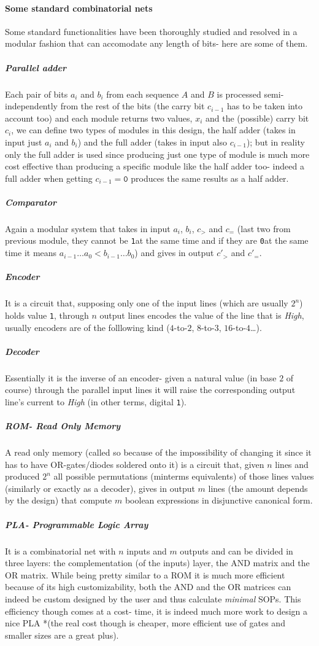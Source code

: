 \documentclass{scrartcl}
\newcommand{\zero}{\texttt{0}}
\newcommand{\one}{\texttt{1}}
\begin{document}
    \paragraph{Some standard combinatorial nets} Some standard functionalities have been thoroughly studied and resolved in a modular fashion that can accomodate any length of bits- here are some of them.
    \subparagraph{Parallel adder} Each pair of bits $a_i$ and $b_i$ from each sequence $A$ and $B$ is processed semi-independently from the rest of the bits (the carry bit $c_{i-1}$ has to be taken into account too) and each module returns two values, $x_i$ and the (possible) carry bit $c_i$, we can define two types of modules in this design, the half adder (takes in input just $a_i$ and $b_i$) and the full adder (takes in input also $c_{i-1}$); but in reality only the full adder is used since producing just one type of module is much more cost effective than producing a specific module like the half adder too- indeed a full adder when getting $c_{i-1}=\zero$ produces the same results as a half adder.
    \subparagraph{Comparator} Again a modular system that takes in input $a_i$, $b_i$, $c_{>}$ and $c_{=}$ (last two from previous module, they cannot be \one at the same time and if they are \zero at the same time it means $a_{i-1}\dots a_0 < b_{i-1}\dots b_0$) and gives in output $c'_{>}$ and $c'_{=}$.
    \subparagraph{Encoder} It is a circuit that, supposing only one of the input lines (which are usually $2^n$) holds value \one, through $n$ output lines encodes the value of the line that is \emph{High}, usually encoders are of the folllowing kind ($4$-to-$2$, $8$-to-$3$, $16$-to-$4$\dots).
    \subparagraph{Decoder} Essentially it is the inverse of an encoder- given a natural value (in base $2$ of course) through the parallel input lines it will raise the corresponding output line's current to \emph{High} (in other terms, digital \one).
    \subparagraph{ROM- Read Only Memory} A read only memory (called so because of the impossibility of changing it since it has to have OR-gates/diodes soldered onto it) is a circuit that, given $n$ lines and produced $2^n$ all possible permutations (minterms equivalents) of those lines values (similarly or exactly as a decoder), gives in output $m$ lines (the amount depends by the design) that compute $m$ boolean expressions in disjunctive canonical form.
    \subparagraph{PLA- Programmable Logic Array} It is a combinatorial net with $n$ inputs and $m$ outputs and can be divided in three layers: the complementation (of the inputs) layer, the AND matrix and the OR matrix. While being pretty similar to a ROM it is much more efficient because of its high customizability, both the AND and the OR matrices can indeed be custom designed by the user and thus calculate \emph{minimal} SOPs. This efficiency though comes at a cost- time, it is indeed much more work to design a nice PLA *(the real cost though is cheaper, more efficient use of gates and smaller sizes are a great plus).
\end{document}
